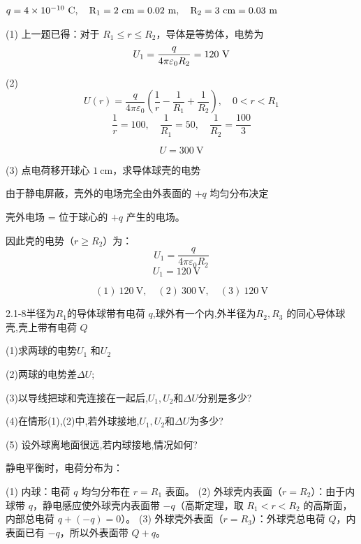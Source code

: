 \documentclass{article}
\begin{document}




$q = 4\times 10^{-10} \ \rm{C}, \quad R_1 = 2\ \rm{cm} = 0.02\ \rm{m}, \quad R_2 = 3\ \rm{cm} = 0.03\ \rm{m}$


 (1)
上一题已得：对于 $ R_1 \le r \le R_2 $，导体是等势体，电势为
$$U_1 = \frac{q}{4\pi\varepsilon_0 R_2}= 120 \ \rm{V}$$

 (2) 
$$U(r) = \frac{q}{4\pi\varepsilon_0} \left( \frac{1}{r} - \frac{1}{R_1} + \frac{1}{R_2} \right), \quad 0 < r < R_1$$
$$\frac{1}{r} = 100, \quad \frac{1}{R_1} = 50, \quad \frac{1}{R_2}=\frac{100}{3}$$

$$U =300 \ \text{V}$$




 (3) 点电荷移开球心 $ 1\ \text{cm} $，求导体球壳的电势


由于静电屏蔽，壳外的电场完全由外表面的 $+q$ 均匀分布决定

壳外电场 = 位于球心的 $+q$ 产生的电场。  

因此壳的电势（$ r \ge R_2 $）为：
$$U_1 = \frac{q}{4\pi\varepsilon_0 R_2}$$
$$U_1 = 120\ \text{V} \quad $$


$$
(1)\ 120\ \text{V}, \quad (2)\ 300\ \text{V}, \quad (3)\ 120\ \text{V}
$$






\newpage

2.1-8半径为$R_1$的导体球带有电荷 $q$,球外有一个内,外半径为$R_2,R_3$ 的同心导体球壳,壳上带有电荷 $Q$

(1)求两球的电势$U_{1}$ 和$U_2$

(2)两球的电势差$\Delta U;$

(3)以导线把球和壳连接在一起后,$U_1,U_2$和$\Delta U$分别是多少?

(4)在情形(1),(2)中,若外球接地,$U_1,U_2$和$\Delta U$为多少?

(5) 设外球离地面很远,若内球接地,情况如何?




静电平衡时，电荷分布为：

(1) 内球：电荷 $ q $ 均匀分布在 $ r = R_1 $ 表面。  
(2) 外球壳内表面（$ r = R_2 $）：由于内球带 $ q $，静电感应使外球壳内表面带 $ -q $（高斯定理，取 $ R_1 < r < R_2 $ 的高斯面，内部总电荷 $ q + (-q) = 0 $）。  
(3) 外球壳外表面（$ r = R_3 $）：外球壳总电荷 $ Q $，内表面已有 $ -q $，所以外表面带 $ Q + q $。
\end{document}
